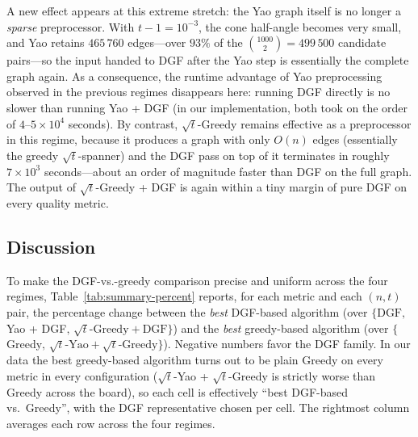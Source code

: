 \documentclass{article}
\begin{document}
A new effect appears at this extreme stretch: the Yao graph itself is
no longer a \emph{sparse} preprocessor. With $t-1=10^{-3}$, the cone
half-angle becomes very small, and Yao retains $465\,760$
edges---over $93\%$ of the $\binom{1000}{2}=499\,500$ candidate
pairs---so the input handed to DGF after the Yao step is essentially
the complete graph again. As a consequence, the runtime advantage of
Yao preprocessing observed in the previous regimes disappears here:
running DGF directly is no slower than running Yao + DGF (in our
implementation, both took on the order of $4$--$5\times 10^{4}$
seconds). By contrast, $\sqrt{t}$-Greedy remains effective as a
preprocessor in this regime, because it produces a graph with only
$O(n)$ edges (essentially the greedy $\sqrt{t}$-spanner) and the DGF
pass on top of it terminates in roughly $7\times 10^{3}$
seconds---about an order of magnitude faster than DGF on the full
graph. The output of $\sqrt{t}$-Greedy + DGF is again within a tiny
margin of pure DGF on every quality metric.

\newpage

\subsection{Discussion}

To make the DGF-vs.-greedy comparison precise and uniform across the
four regimes, Table~\ref{tab:summary-percent} reports, for each
metric and each $(n,t)$ pair, the percentage change between the
\emph{best} DGF-based algorithm (over $\{\text{DGF},\,$Yao + DGF$,\,
\sqrt{t}\text{-Greedy} + \text{DGF}\}$) and the \emph{best}
greedy-based algorithm (over $\{$Greedy$,\,\sqrt{t}\text{-Yao} +
\sqrt{t}\text{-Greedy}\}$). Negative numbers favor the DGF family. In
our data the best greedy-based algorithm turns out to be plain Greedy
on every metric in every configuration ($\sqrt{t}$-Yao +
$\sqrt{t}$-Greedy is strictly worse than Greedy across the board), so
each cell is effectively ``best DGF-based vs.\ Greedy'', with the
DGF representative chosen per cell. The rightmost column averages
each row across the four regimes.
\end{document}
